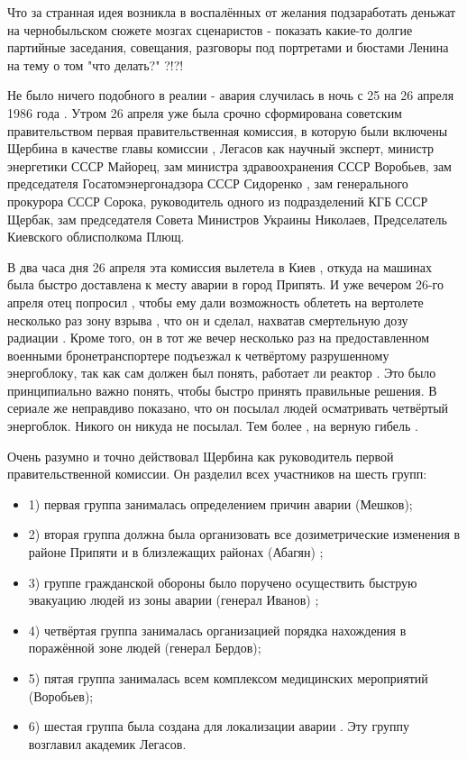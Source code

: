 Что за странная идея возникла в воспалённых от желания подзаработать деньжат на
чернобыльском сюжете мозгах  сценаристов -  показать какие-то долгие партийные
заседания, совещания, разговоры под портретами и бюстами Ленина на тему о том
"что делать?" ?!?! 

Не было ничего подобного в реалии - авария  случилась в ночь с 25 на 26 апреля
1986 года . Утром 26 апреля уже была срочно сформирована советским
правительством первая правительственная комиссия, в которую были включены
Щербина в качестве главы комиссии , Легасов как научный эксперт, министр
энергетики СССР Майорец, зам министра здравоохранения СССР Воробьев, зам
председателя Госатомэнергонадзора СССР Сидоренко , зам генерального прокурора
СССР Сорока, руководитель одного из подразделений КГБ СССР Щербак, зам
председателя Совета Министров Украины Николаев, Предселатель Киевского
облисполкома Плющ. 

В два часа дня 26 апреля эта комиссия вылетела в Киев , откуда на машинах была
быстро доставлена к месту аварии в город Припять. И уже вечером 26-го апреля
отец попросил , чтобы ему дали возможность облететь на вертолете несколько раз
зону взрыва , что он и сделал, нахватав смертельную дозу радиации . Кроме того,
он в тот же вечер несколько раз на предоставленном военными бронетранспортере
подъезжал к четвёртому разрушенному энергоблоку, так как сам должен был понять,
работает ли реактор . Это было принципиально важно понять, чтобы быстро принять
правильные решения. В сериале же неправдиво показано, что он посылал людей
осматривать четвёртый энергоблок. Никого он никуда не посылал. Тем более , на
верную гибель . 

Очень разумно и точно действовал Щербина как руководитель первой
правительственной комиссии. Он разделил всех участников на шесть групп: 

\begin{itemize}
  \item 1) первая группа занималась определением причин аварии (Мешков); 
  \item 2) вторая группа должна была организовать все дозиметрические изменения в районе Припяти и в близлежащих районах (Абагян) ; 
  \item 3) группе гражданской обороны было поручено осуществить быструю эвакуацию людей из зоны аварии (генерал Иванов) ; 
  \item 4) четвёртая группа занималась организацией порядка нахождения в поражённой зоне людей (генерал Бердов); 
  \item 5) пятая группа занималась всем комплексом медицинских мероприятий (Воробьев); 
  \item 6) шестая группа была создана для локализации аварии . Эту группу возглавил академик Легасов.
\end{itemize}

